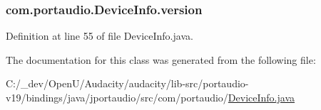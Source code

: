 \subsubsection[{\texorpdfstring{version}{version}}]{ com.\+portaudio.\+Device\+Info.\+version}\hypertarget{classcom_1_1portaudio_1_1_device_info_a18afde8a6a94652250413d0cc45b24da}{}\label{classcom_1_1portaudio_1_1_device_info_a18afde8a6a94652250413d0cc45b24da}


Definition at line 55 of file Device\+Info.\+java.



The documentation for this class was generated from the following file\+:\begin{DoxyCompactItemize}
\item 
C\+:/\+\_\+dev/\+Open\+U/\+Audacity/audacity/lib-\/src/portaudio-\/v19/bindings/java/jportaudio/src/com/portaudio/\hyperlink{_device_info_8java}{Device\+Info.\+java}\end{DoxyCompactItemize}
